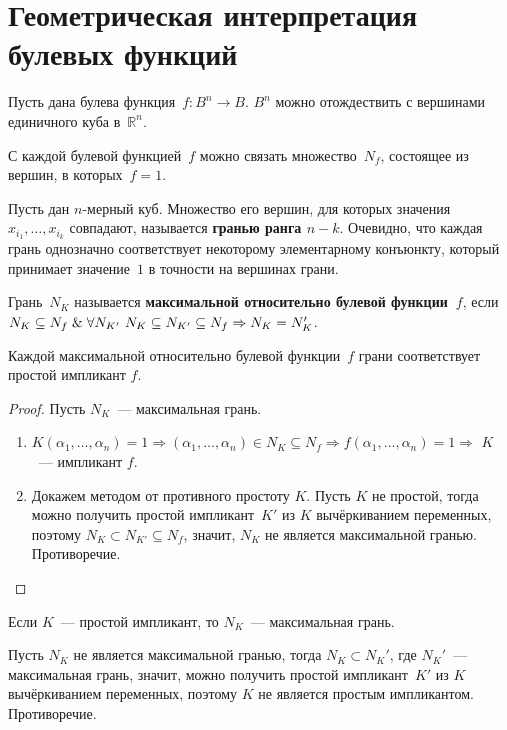\section{Геометрическая интерпретация булевых функций}
Пусть дана булева функция~$f \colon B^n \to B$.
$B^n$ можно отождествить с вершинами единичного куба в~$\mathbb R^n$.

С каждой булевой функцией~$f$ можно связать множество~$N_f$, состоящее из вершин, в которых~$f = 1$.

Пусть дан $n$-мерный куб.
 Множество его вершин, для которых значения~$x_{i_1}, \ldots, x_{i_k}$ совпадают, называется \textbf{гранью ранга $n - k$}.
Очевидно, что каждая грань однозначно соответствует некоторому элементарному конъюнкту, который принимает значение~$1$ в точности на вершинах грани.

Грань~$N_K$ называется \textbf{максимальной относительно булевой функции~$f$}, если $N_K \subseteq N_f \lAnd \forall N_{K'} \ N_K \opbr\subseteq N_{K'} \opbr\subseteq N_f \Rightarrow N_K = N_K'$.

\begin{statement}
Каждой максимальной относительно булевой функции~$f$ грани соответствует простой импликант $f$.
\end{statement}
\begin{proof}
Пусть $N_K$~--- максимальная грань.
\begin{enumerate}
	\item $K(\alpha_1, \ldots, \alpha_n) = 1 \Rightarrow
	(\alpha_1, \ldots, \alpha_n) \in N_K \subseteq N_f \Rightarrow
	f(\alpha_1, \ldots, \alpha_n) = 1 \Rightarrow$
	$K$~--- импликант $f$.
	
	\item Докажем методом от противного простоту $K$.
	Пусть $K$ не простой, тогда можно получить простой импликант~$K'$ из $K$ вычёркиванием переменных, поэтому $N_K \subset N_{K'} \subseteq N_f$, значит, $N_K$ не является максимальной гранью.
	Противоречие.
\end{enumerate}
\end{proof}

\begin{statement}
Если $K$~--- простой импликант, то $N_K$~--- максимальная грань.
\end{statement}
\begin{proofcontra}
Пусть $N_K$ не является максимальной гранью, тогда $N_K \subset N_K'$, где $N_K'$~--- максимальная грань, значит, можно получить простой импликант~$K'$ из $K$ вычёркиванием переменных, поэтому $K$ не является простым импликантом.
Противоречие.
\end{proofcontra}

